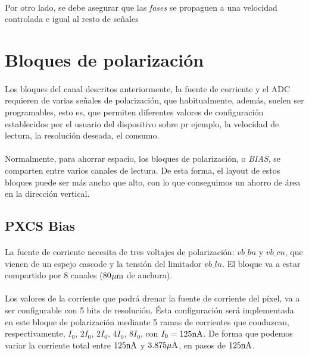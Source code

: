 
\paragraph{}
Por otro lado, se debe asegurar que las \textit{fases} se propaguen a una velocidad
controlada e igual al resto de señales

\section{Bloques de polarización}\label{cap:ro_sch_bias}

\paragraph{}
Los bloques del canal descritos anteriormente, la fuente de corriente y el ADC
requieren de varias señales de polarización, que habitualmente, además, suelen
ser programables, esto es, que permiten diferentes valores de configuración
establecidos por el usuario del dispositivo sobre pr ejemplo, la velocidad de
lectura, la resolución deseada, el consumo.

\paragraph{}
Normalmente, para ahorrar espacio, los bloques de polarización, o \textit{BIAS},
se comparten entre varios canales de lectura. De esta forma, el layout de estos
bloques puede ser más ancho que alto, con lo que conseguimos un ahorro de área en
la dirección vertical.

\subsection{PXCS Bias}

\paragraph{}
La fuente de corriente necesita de tres voltajes de polarización: $vb\_bn$ y
$vb\_cn$, que vienen de un espejo cascode y la tensión del limitador $vb\_ln$.
El bloque va a estar compartido por 8 canales (80$\mu\text{m}$ de anchura).

\paragraph{}
Los valores de la corriente que podrá drenar la fuente de corriente del píxel, va
a ser configurable con 5 bits de resolución. Ésta configuración será implementada
en este bloque de polarización mediante 5 ramas de corrientes que conduzcan,
respectivamente, $I_0$, $2I_0$, $2I_0$, $4I_0$, $8I_0$, con
$I_0=125\text{nA}$. De forma que podemos variar la corriente total entre $125\text{nA}$ y
$3.875\mu\text{A}$, en pasos de $125\text{nA}$.

